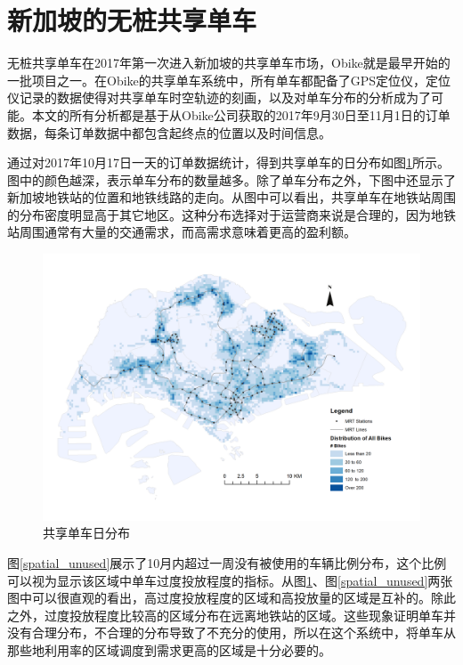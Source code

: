 \documentclass[]{tongjithesis}
\numberwithin{equation}{chapter}
\begin{document}
\section{新加坡的无桩共享单车}
无桩共享单车在2017年第一次进入新加坡的共享单车市场，Obike就是最早开始的一批项目之一。在Obike的共享单车系统中，所有单车都配备了GPS定位仪，定位仪记录的数据使得对共享单车时空轨迹的刻画，以及对单车分布的分析成为了可能。本文的所有分析都是基于从Obike公司获取的2017年9月30日至11月1日的订单数据，每条订单数据中都包含起终点的位置以及时间信息。

通过对2017年10月17日一天的订单数据统计，得到共享单车的日分布如图\ref{spatial_aday}所示。图中的颜色越深，表示单车分布的数量越多。除了单车分布之外，下图中还显示了新加坡地铁站的位置和地铁线路的走向。从图中可以看出，共享单车在地铁站周围的分布密度明显高于其它地区。这种分布选择对于运营商来说是合理的，因为地铁站周围通常有大量的交通需求，而高需求意味着更高的盈利额。

\begin{figure}[H]
	\centering
	\includegraphics[width= 0.9 \textwidth]{figures_main/spatial_distribution_aday.png}
	\caption{共享单车日分布}
	\label{spatial_aday}
\end{figure}

图\ref{spatial_unused}展示了10月内超过一周没有被使用的车辆比例分布，这个比例可以视为显示该区域中单车过度投放程度的指标。从图\ref{spatial_aday}、图\ref{spatial_unused}两张图中可以很直观的看出，高过度投放程度的区域和高投放量的区域是互补的。除此之外，过度投放程度比较高的区域分布在远离地铁站的区域。这些现象证明单车并没有合理分布，不合理的分布导致了不充分的使用，所以在这个系统中，将单车从那些地利用率的区域调度到需求更高的区域是十分必要的。
\end{document}
